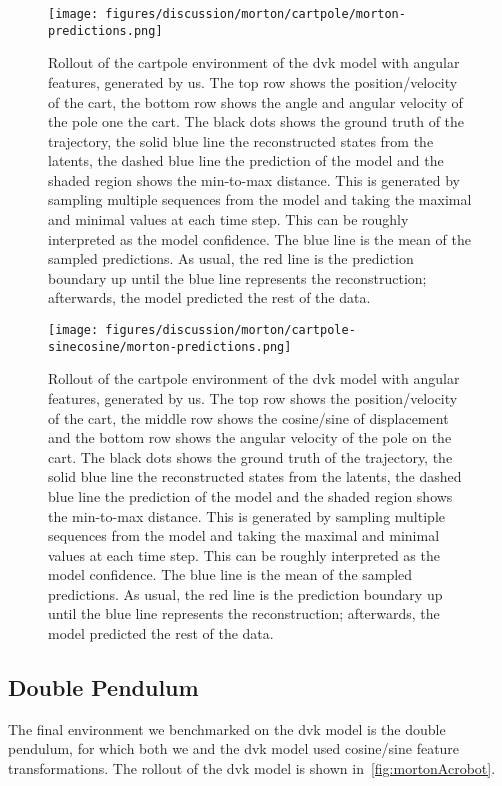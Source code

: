 		\begin{figure}
			\centering
			\texttt{[image: figures/discussion/morton/cartpole/morton-predictions.png]}
			\caption[Rollout of the cartpole environment of the \ac{dvk} model with angular features]{Rollout of the cartpole environment of the \ac{dvk} model with angular features, generated by us. The top row shows the position/velocity of the cart, the bottom row shows the angle and angular velocity of the pole one the cart. The black dots shows the ground truth of the trajectory, the solid blue line the reconstructed states from the latents, the dashed blue line the prediction of the model and the shaded region shows the min-to-max distance. This is generated by sampling multiple sequences from the model and taking the maximal and minimal values at each time step. This can be roughly interpreted as the model confidence. The blue line is the mean of the sampled predictions. As usual, the red line is the prediction boundary up until the blue line represents the reconstruction; afterwards, the model predicted the rest of the data.}
			\label{fig:mortonCartpoleAngle}
		\end{figure}
		\begin{figure}
			\centering
			\texttt{[image: figures/discussion/morton/cartpole-sinecosine/morton-predictions.png]}
			\caption[Rollout of the cartpole environment of the \ac{dvk} model with sine/cosine features]{Rollout of the cartpole environment of the \ac{dvk} model with angular features, generated by us. The top row shows the position/velocity of the cart, the middle row shows the cosine/sine of displacement and the bottom row shows the angular velocity of the pole on the cart. The black dots shows the ground truth of the trajectory, the solid blue line the reconstructed states from the latents, the dashed blue line the prediction of the model and the shaded region shows the min-to-max distance. This is generated by sampling multiple sequences from the model and taking the maximal and minimal values at each time step. This can be roughly interpreted as the model confidence. The blue line is the mean of the sampled predictions. As usual, the red line is the prediction boundary up until the blue line represents the reconstruction; afterwards, the model predicted the rest of the data.}
			\label{fig:mortonCartpoleSineCosine}
		\end{figure}

	\subsection{Double Pendulum}
		The final environment we benchmarked on the \ac{dvk} model is the double pendulum, for which both we and the \ac{dvk} model used cosine/sine feature transformations. The rollout of the \ac{dvk} model is shown in~\autoref{fig:mortonAcrobot}.

